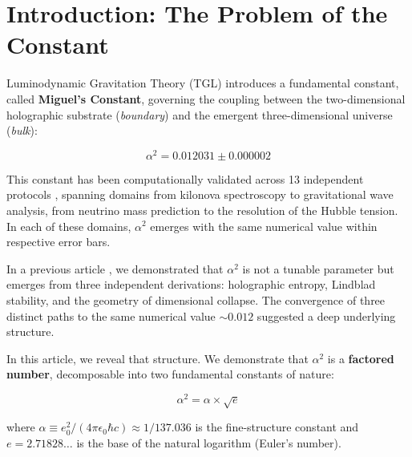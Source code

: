 \documentclass[12pt,a4paper,twoside]{article}
\newcommand{\alphaii}{\alpha^{2}}
\newcommand{\boundary}{\textit{boundary}}
\newcommand{\bulk}{\textit{bulk}}
\begin{document}
\tableofcontents
\newpage


\section{Introduction: The Problem of the Constant}

Luminodynamic Gravitation Theory (TGL) \cite{Miguel2026Fronteira, Miguel2026LastString} introduces a fundamental constant, called \textbf{Miguel's Constant}, governing the coupling between the two-dimensional holographic substrate (\boundary) and the emergent three-dimensional universe (\bulk):

\begin{equation}
\alphaii = 0.012031 \pm 0.000002
\label{eq:alphaii_value}
\end{equation}

This constant has been computationally validated across 13 independent protocols \cite{Miguel2026GitHub}, spanning domains from kilonova spectroscopy to gravitational wave analysis, from neutrino mass prediction to the resolution of the Hubble tension. In each of these domains, $\alphaii$ emerges with the same numerical value within respective error bars.

In a previous article \cite{Miguel2025Alpha2}, we demonstrated that $\alphaii$ is not a tunable parameter but emerges from three independent derivations: holographic entropy, Lindblad stability, and the geometry of dimensional collapse. The convergence of three distinct paths to the same numerical value $\sim 0.012$ suggested a deep underlying structure.

In this article, we reveal that structure. We demonstrate that $\alphaii$ is a \textbf{factored number}, decomposable into two fundamental constants of nature:

\begin{equationbox}[title={The Factorization}]
\begin{equation}
\boxed{\alphaii = \alpha \times \sqrt{e}}
\label{eq:fatoracao}
\end{equation}
\end{equationbox}

\noindent where $\alpha \equiv e_0^2 / (4\pi\epsilon_0 \hbar c) \approx 1/137.036$ is the fine-structure constant and $e = 2.71828\ldots$ is the base of the natural logarithm (Euler's number).
\end{document}
